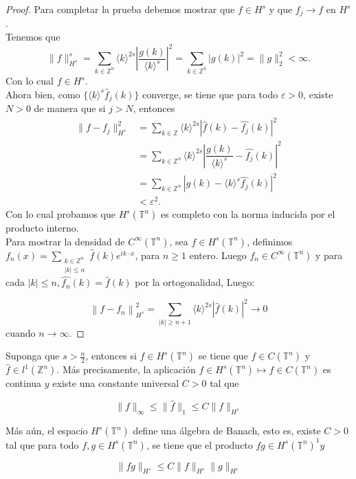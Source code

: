 \documentclass[12pt]{article}
\newcommand\Z{\ensuremath{\mathbb{Z}}}
\newcommand\T{\mathbb{T}}
\renewcommand{\epsilon}{\varepsilon}
\renewcommand{\hat}{\widehat}
\begin{document}
\begin{proof}
Para completar la prueba debemos mostrar que $f\in H^{s}$ y que $f_{j}\rightarrow f$ en $H^{s}$.\\
Tenemos que
$$\|f\|^{s}_{H^{s}}=\displaystyle\sum_{k\in \Z ^{n}} \langle k \rangle^{2s}\left| \dfrac{g(k)}{\langle k\rangle^{s}}\right|^{2}=\displaystyle\sum_{k\in \Z^{n}}|g(k)|^{2}=\|g\|^{2}_{2}<\infty.$$
Con lo cual $f\in H^{s}$.\\
Ahora bien, como $\{\langle k \rangle^{s}\widehat{f}_j(k)\}$ converge, se tiene que para todo $\epsilon>0$, existe $N>0$ de manera que si $j>N$, entonces 
\begin{align*}
   \|f-f_j\|_{H^{s}}^{2}&=\sum_{k\in \Z}\langle k \rangle^{2s}|\hat{f}(k)-\hat{f_j}(k)|^{2}\\
   &=\sum_{k\in \Z^{n}} \langle k\rangle^{2s}\left| \dfrac{g(k)}{\langle k \rangle^{s}}-  \hat{f_j}(k) \right|^{2} \\
   &= \sum_{k\in \Z^{n}} \left| g(k)- \langle k\rangle^{s} \hat{f_j}(k) \right|^{2} \\
   &< \epsilon^{2}
.\end{align*}
Con lo cual probamos que $H^{s}(\T^{n})$ es completo con la norma inducida por el producto interno.\\

Para mostrar la densidad de $C^{\infty}(\T^ n)$, sea $f \in H^s(\T^n)$, definimos $\displaystyle f_n(x)=\sum_{\substack{k\in \Z^n\\
|k|\leq n}} \widehat{f}(k) e^{i k \cdot x}$, para $n \geq 1$ entero. Luego $f_n \in C^{\infty}(\T^n)$ y para cada $|k| \leq n, \widehat{f_n}(k)=\widehat{f}(k)$ por la ortogonalidad, Luego:

$$
\left\|f-f_n\right\|_{H^s}^2=\sum_{|k| \geq n+1}\langle k\rangle^{2 s}|\widehat{f}(k)|^2 \rightarrow 0
$$
cuando  $n\to \infty$.
\end{proof}

\begin{theorem}\label{algebra}
Suponga que $s>\frac{n}{2}$, entonces si $f \in H^s\left(\mathbb{T}^n\right)$ se tiene que $f\in C\left(\mathbb{T}^n\right)$ y $\widehat{f} \in l^1\left(\mathbb{Z}^n\right)$. Más precisamente, la aplicación $f \in H^s\left(\mathbb{T}^n\right) \mapsto f \in C\left(\mathbb{T}^n\right)$ es continua $y$ existe una constante universal $C>0$ tal que

$$
\|f\|_{\infty} \leq\|\widehat{f}\|_1 \leq C\|f\|_{H^s}
$$


Más aún, el espacio $H^s\left(\mathbb{T}^n\right)$ define una álgebra de Banach, esto es, existe $C>0$ tal que para todo $f, g \in H^s\left(\mathbb{T}^n\right)$, se tiene que el producto $f g \in H^s\left(\mathbb{T}^n\right)^1 y$

$$
\|f g\|_{H^s} \leq C\|f\|_{H^s}\|g\|_{H^s}
$$
\end{theorem}
\end{document}

